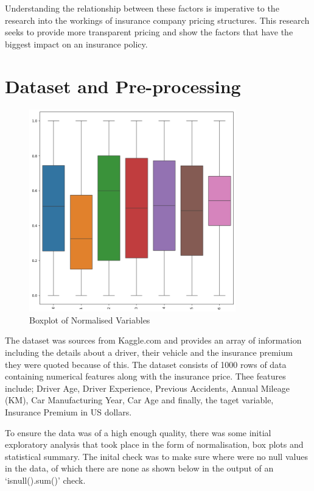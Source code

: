 \documentclass{article}
\begin{document}
Understanding the relationship between these factors is imperative to the research into the workings of insurance company pricing structures. This research seeks to provide more transparent pricing and show the factors that have the biggest impact on an insurance policy.

\newpage
\section{Dataset and Pre-processing}

\begin{figure}[h]
\centering
\includegraphics[width=0.8\textwidth]{boxplot.png}
\caption{Boxplot of Normalised Variables}\label{fig:boxplot}
\end{figure}

The dataset was sources from Kaggle.com and provides an array of information including the details about a driver, their vehicle and the insurance premium they were quoted because of this\cite{Sriram_2025}. The dataset consists of 1000 rows of data containing numerical features along with the insurance price. Thee features include; Driver Age, Driver Experience, Previous Accidents, Annual Mileage (KM), Car Manufacturing Year, Car Age and finally, the taget variable, Insurance Premium in US dollars.  

To ensure the data was of a high enough quality, there was some initial exploratory analysis that took place in the form of normalisation, box plots and statistical summary. The inital check was to make sure where were no null values in the data, of which there are none as shown below in the output of an `isnull().sum()' check.
\end{document}
